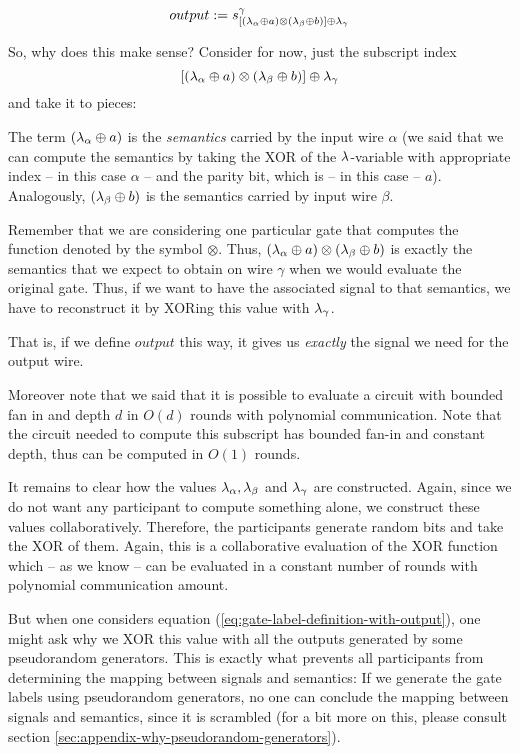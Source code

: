 \begin{equation}
  \label{eq:output-straight-definition-in-informal-part}
  output := s^\gamma_{ \left[ (\lambda_\alpha \oplus a) \otimes (\lambda_\beta \oplus b)\right]  \oplus \lambda_\gamma}
\end{equation}

So, why does this make sense? Consider for now, just the subscript index
\begin{equation*}
\left[ (\lambda_\alpha \oplus a) \otimes (\lambda_\beta \oplus b)\right]  \oplus \lambda_\gamma
\end{equation*}
and take it to pieces:

The term $(\lambda_\alpha \oplus a)$ is the \emph{semantics} carried by the input wire $\alpha$ (we said that we can compute the semantics by taking the XOR of the $\lambda$-variable with appropriate index -- in this case $\alpha$ -- and the parity bit, which is -- in this case -- $a$). Analogously, $(\lambda_\beta \oplus b)$ is the semantics carried by input wire $\beta$.

Remember that we are considering one particular gate that computes the function denoted by the symbol $\otimes$. Thus, $(\lambda_\alpha \oplus a)\otimes (\lambda_\beta \oplus b)$ is exactly the semantics that we expect to obtain on wire $\gamma$ when we would evaluate the original gate. Thus, if we want to have the associated signal to that semantics, we have to reconstruct it by XORing this value with $\lambda_\gamma$.

That is, if we define $output$ this way, it gives us \emph{exactly} the signal we need for the output wire.

Moreover note that we said that it is possible to evaluate a circuit with bounded fan in and depth $d$ in $O(d)$ rounds with polynomial communication. Note that the circuit needed to compute this subscript has bounded fan-in and constant depth, thus can be computed in $O(1)$ rounds.

It remains to clear how the values $\lambda_\alpha,\lambda_\beta$ and $\lambda_\gamma$ are constructed. Again, since we do not want any participant to compute something alone, we construct these values collaboratively. Therefore, the participants generate random bits and take the XOR of them. Again, this is a collaborative evaluation of the XOR function which -- as we know -- can be evaluated in a constant number of rounds with polynomial communication amount.

But when one considers equation (\ref{eq:gate-label-definition-with-output}), one might ask why we XOR this value with all the outputs generated by some pseudorandom generators. This is exactly what prevents all participants from determining the mapping between signals and semantics: If we generate the gate labels using pseudorandom generators, no one can conclude the mapping between signals and semantics, since it is scrambled (for a bit more on this, please consult section \ref{sec:appendix-why-pseudorandom-generators}). 

